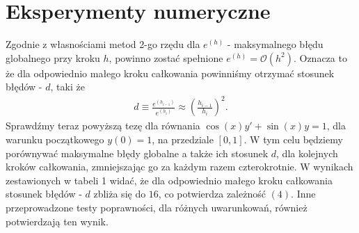 \documentclass[a4paper,12pt]{article}
\begin{document}
\section*{Eksperymenty numeryczne}
Zgodnie z własnościami metod 2-go rzędu dla $e^{(h)}$ - maksymalnego błędu globalnego przy kroku $h$, powinno zostać spełnione $e^{(h)} = \mathcal{O}(h^2)$. Oznacza to że dla odpowiednio małego kroku całkowania powinniśmy otrzymać stosunek błędów - $d$, taki że
\begin{align}
d \equiv \frac{e^{(h_{i-1})}}{e^{(h_{i})}} \approx \left(\frac{h_{i-1}}{h_i}\right)^2.
\end{align}
Sprawdźmy teraz powyższą tezę dla równania $\cos(x)y' + \sin(x)y = 1$, dla warunku początkowego $y(0) = 1$, na przedziale $[0,1]$. W tym celu będziemy porównywać maksymalne błędy globalne a także ich stosunek $d$, dla kolejnych kroków całkowania, zmniejszając go za każdym razem czterokrotnie. W wynikach zestawionych w tabeli 1 widać, że dla odpowiednio małego kroku całkowania stosunek błędów - $d$ zbliża się do $16$, co potwierdza zależność $(4)$. Inne przeprowadzone testy poprawności, dla różnych uwarunkowań, również potwierdzają ten wynik.
\end{document}

